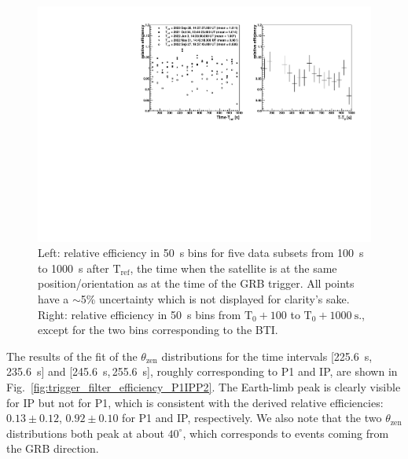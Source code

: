 \documentclass[preprint]{aastex631}
\begin{document}
\begin{figure}[t]
    \centering    
    \includegraphics[width=0.9\linewidth]{paper_allshowscananalimbtemplate_EtkrUB2.pdf}
    \caption{Left: relative efficiency in 50~s bins for five data subsets from 100~s to 1000~s after $\mathrm{T}_\mathrm{ref}$, the time when the satellite is at the same position/orientation as at the time of the GRB trigger. All points have a $\sim$5\% uncertainty which is not displayed for clarity's sake.  Right: relative efficiency in 50~s bins from $\mathrm{T}_0+100$ to $\mathrm{T}_0+1000~\mathrm{s}$., except for the two bins corresponding to the BTI.} 
    \label{fig:trigger_filter_efficiency_scan}
\end{figure}

The results of the fit of the $\theta_\mathrm{zen}$ distributions for the time intervals [225.6~s,\,235.6~s] and [245.6~s,\,255.6~s], roughly corresponding to P1 and IP, are shown in Fig.~\ref{fig:trigger_filter_efficiency_P1IPP2}. The Earth-limb peak is clearly visible for IP but not for P1, which is consistent with the derived relative efficiencies: $0.13 \pm 0.12$, $0.92 \pm 0.10$ for P1 and IP, respectively. We also note that the two $\theta_\mathrm{zen}$ distributions both peak at about $40^\circ$, which corresponds to events coming from the GRB direction.
\end{document}
